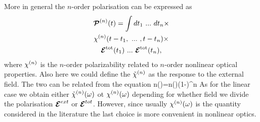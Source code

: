        More in general the $n$-order polarisation can be expressed as
       \begin{multline}\label{eq:PpwrfE}
               \PPo n(t)= \int dt_1\ ...\ dt_n\times \\ \susc n(t-t_1,\ ...\ ,t-t_n)\times  \\ 
                        \Efield^{\text{tot}}(t_1)\ ...\ \Efield^{\text{tot}}(t_n) ,
                \end{multline}
                where $\chi^{(n)}$ is the $n$-order polarizability related to $n$-order nonlinear
                optical properties.
                Also here we could define the $\tilde{\chi}^{(n)}$ as the response to the external field.
                The two can be related from the equation
                \be
                \tsusc n(\w)=\susc n(\w)(1-)^n
                \ee
                As for the linear case we obtain either $\tilde{\chi}^{(n)}(\omega)$ ot $\chi^{(n)}(\omega)$
                depending for whether field we divide the polarisation $\boldsymbol{\cal E}^{ext}$ or $\boldsymbol{\cal E}^{tot}$.
                However, since usually $\chi^{(n)}(\omega)$ is the quantity considered in the literature the
                last choice is more convenient in nonlinear optics.

